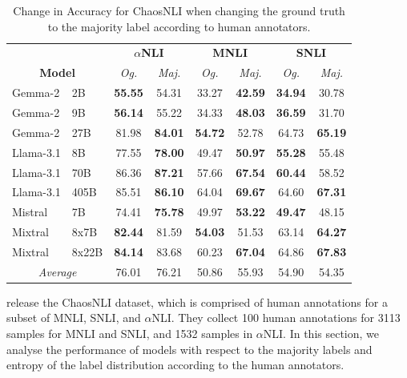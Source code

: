 \begin{table}[h]
    \centering
    \begin{tabular}{llcccccc}
        & & \multicolumn{2}{c}{\textbf{$\alpha$NLI}} & \multicolumn{2}{c}{\textbf{MNLI}} & \multicolumn{2}{c}{\textbf{SNLI}} \\
        \multicolumn{2}{c}{\textbf{Model}} & \textit{Og.} & \textit{Maj.} & \textit{Og.} & \textit{Maj.} & \textit{Og.} & \textit{Maj.}\\
        \toprule
        Gemma-2 & 2B & \textbf{55.55} & 54.31 & 33.27 & \textbf{42.59} & \textbf{34.94} & 30.78 \\
        Gemma-2 & 9B & \textbf{56.14} & 55.22 & 34.33 & \textbf{48.03} & \textbf{36.59} & 31.70 \\
        Gemma-2 & 27B & 81.98 & \textbf{84.01} & \textbf{54.72} & 52.78 & 64.73 & \textbf{65.19} \\
        \midrule
        Llama-3.1 & 8B & 77.55 & \textbf{78.00} & 49.47 & \textbf{50.97} & \textbf{55.28} & 55.48 \\
        Llama-3.1 & 70B & 86.36 & \textbf{87.21} & 57.66 & \textbf{67.54} & \textbf{60.44} & 58.52 \\
        Llama-3.1 & 405B & 85.51 & \textbf{86.10} & 64.04 & \textbf{69.67} & 64.60 & \textbf{67.31} \\
        \midrule
        Mistral & 7B & 74.41 & \textbf{75.78} & 49.97 & \textbf{53.22} & \textbf{49.47} & 48.15 \\
        Mixtral & 8x7B & \textbf{82.44} & 81.59 & \textbf{54.03} & 51.53 & 63.14 & \textbf{64.27} \\
        Mixtral & 8x22B & \textbf{84.14} & 83.68 & 60.23 & \textbf{67.04} & 64.86 & \textbf{67.83} \\
        \midrule
        \multicolumn{2}{c}{\emph{Average}} & 76.01 & 76.21 & 50.86 & 55.93 & 54.90 & 54.35 \\
    \bottomrule
    \end{tabular}
\caption{Change in Accuracy for ChaosNLI when changing the ground truth to the majority label according to human annotators.}
\label{tab:chaos_acc}
\end{table}


\citet{nie-etal-2020-learn} release the ChaosNLI dataset, which is comprised of human annotations for a subset of MNLI, SNLI, and $\alpha$NLI. They collect 100 human annotations for 3113 samples for MNLI and SNLI, and 1532 samples in $\alpha$NLI. 
In this section, we analyse the performance of models with respect to the majority labels and entropy of the label distribution according to the human annotators.

